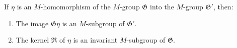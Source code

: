 If $\eta$ is an $M$-homomorphism of the $M$-group $\mathfrak{G}$ into the $M$-group $\mathfrak{G}'$, then:

\begin{enumerate}
\item The image $\mathfrak{G}\eta$ is an $M$-subgroup of $\mathfrak{G}'$.
\item The kernel $\mathfrak{R}$ of $\eta$ is an invariant $M$-subgroup of $\mathfrak{G}$.
\end{enumerate}

